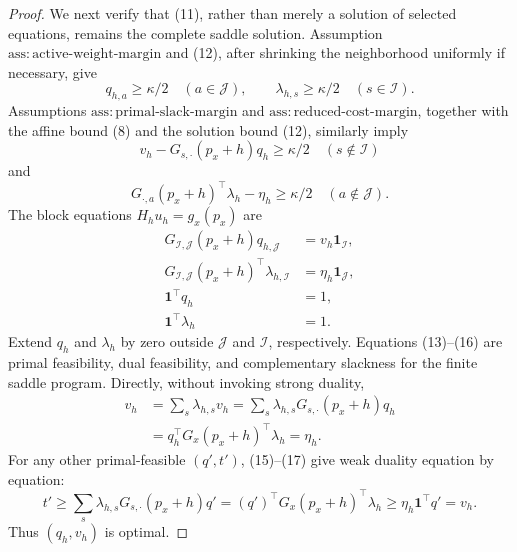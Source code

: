 \documentclass{article}
\begin{document}
\begin{proof}
We next verify that (11), rather than merely a solution of selected equations, remains the complete saddle solution.  Assumption \(\mathrm{ass{:}active\mbox{-}weight\mbox{-}margin}\) and (12), after shrinking the neighborhood uniformly if necessary, give
\[
 q_{h,a}\geq\kappa/2\quad(a\in\mathcal J),\qquad
 \lambda_{h,s}\geq\kappa/2\quad(s\in\mathcal I).
 \tag{13}
\]
Assumptions \(\mathrm{ass{:}primal\mbox{-}slack\mbox{-}margin}\) and \(\mathrm{ass{:}reduced\mbox{-}cost\mbox{-}margin}\), together with the affine bound (8) and the solution bound (12), similarly imply
\[
 v_h-G_{s,\cdot}(p_x+h)q_h\geq\kappa/2
       \quad(s\notin\mathcal I)
 \tag{14}
\]
and
\[
 G_{\cdot,a}(p_x+h)^\top\lambda_h-\eta_h\geq\kappa/2
       \quad(a\notin\mathcal J).
 \tag{15}
\]
The block equations \(H_hu_h=g_x(p_x)\) are
\[
 \begin{aligned}
 G_{\mathcal I,\mathcal J}(p_x+h)q_{h,\mathcal J}
       &=v_h\mathbf 1_{\mathcal I},\\
 G_{\mathcal I,\mathcal J}(p_x+h)^\top\lambda_{h,\mathcal I}
       &=\eta_h\mathbf 1_{\mathcal J},\\
 \mathbf 1^\top q_h&=1,\\
 \mathbf 1^\top\lambda_h&=1.
 \end{aligned}
 \tag{16}
\]
Extend \(q_h\) and \(\lambda_h\) by zero outside \(\mathcal J\) and \(\mathcal I\), respectively.  Equations (13)--(16) are primal feasibility, dual feasibility, and complementary slackness for the finite saddle program.  Directly, without invoking strong duality,
\[
 \begin{aligned}
 v_h
 &=\sum_s\lambda_{h,s}v_h
 =\sum_s\lambda_{h,s}G_{s,\cdot}(p_x+h)q_h\\
 &=q_h^\top G_x(p_x+h)^\top\lambda_h
 =\eta_h.
 \end{aligned}
 \tag{17}
\]
For any other primal-feasible \((q',t')\), (15)--(17) give weak duality equation by equation:
\[
 t'\geq\sum_s\lambda_{h,s}G_{s,\cdot}(p_x+h)q'
 =(q')^\top G_x(p_x+h)^\top\lambda_h
 \geq\eta_h\mathbf 1^\top q'=v_h.
 \tag{18}
\]
Thus \((q_h,v_h)\) is optimal.


\end{proof}
\end{document}

